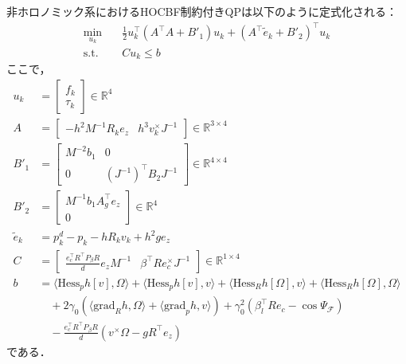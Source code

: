 非ホロノミック系におけるHOCBF制約付きQPは以下のように定式化される：
\begin{equation}
\begin{aligned}
\min_{u_k} \quad & \frac{1}{2} u_k^\top (A^\top A + B'_1) u_k + (A^\top \tilde{e}_k + B'_2)^\top u_k \\
\mathrm{s.t.} \quad & C u_k \leq b
\label{eq:nonholonomic_qp}
\end{aligned}
\end{equation}
ここで，
\begin{equation}
\begin{aligned}
u_k &= \begin{bmatrix} f_k \\ \tau_k \end{bmatrix} \in \mathbb{R}^4 \\
A &= \begin{bmatrix} -h^2 M^{-1} R_k e_z & h^3 v_k^\times J^{-1} \end{bmatrix} \in \mathbb{R}^{3 \times 4} \\
B'_1 &= \begin{bmatrix} M^{-2} b_1 & 0 \\ 0 & (J^{-1})^\top B_2 J^{-1} \end{bmatrix} \in \mathbb{R}^{4 \times 4} \\
B'_2 &= \begin{bmatrix} M^{-1} b_1 A_g^\top e_z \\ 0 \end{bmatrix} \in \mathbb{R}^4 \\
\tilde{e}_k &= p^d_k - p_k - h R_k v_k + h^2 g e_z \\
C &= \begin{bmatrix} \frac{e_c^\top R^\top P_\beta R}{d} e_z M^{-1} & \beta^\top R e_c^\times J^{-1} \end{bmatrix} \in \mathbb{R}^{1 \times 4} \\
b &= \langle \mathrm{Hess}_p h[v], \Omega \rangle + \langle \mathrm{Hess}_p h[v], v \rangle + \langle \mathrm{Hess}_R h[\Omega], v \rangle + \langle \mathrm{Hess}_R h[\Omega], \Omega \rangle \\
&\quad + 2\gamma_0 (\langle \mathrm{grad}_R h, \Omega \rangle + \langle \mathrm{grad}_p h, v \rangle) + \gamma_0^2 (\beta_l^\top R e_c - \cos\Psi_\mathcal{F}) \\
&\quad - \frac{e_c^\top R^\top P_\beta R}{d} (v^\times \Omega - g R^\top e_z)
\label{eq:nonholonomic_qp_params}
\end{aligned}
\end{equation}
である．

